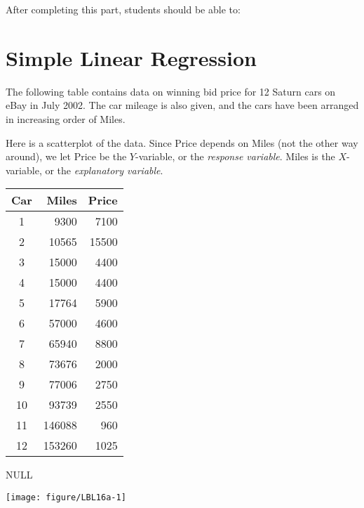 \documentclass[11pt]{book}\usepackage[]{graphicx}\usepackage[]{color}
\begin{document}
After completing this part, students should be able to:


\section{Simple Linear Regression}  

The following table contains data on winning bid price for 12 Saturn cars on eBay in July 2002.  The car mileage is also given, and the cars have been arranged in increasing order of Miles.

Here is a scatterplot of the data.  Since Price depends on Miles (not the other way around), we let Price be the $Y$-variable, or the \textit{response variable}.    Miles is the $X$-variable, or the \textit{explanatory variable}.

\newpage

\begin{minipage}[ht]{5cm}

\centering
{\small{
\begin{tabular}{@{} c rr @{}} \hline
Car & Miles & Price  \\ \hline
1 & 9300 & 7100 \\
2 & 10565 & 15500 \\
3 & 15000 & 4400 \\
4 & 15000 & 4400 \\
5 & 17764 & 5900 \\
6 & 57000 & 4600 \\
7 & 65940 & 8800 \\
8 & 73676 & 2000 \\
9 & 77006 & 2750 \\
10 & 93739 & 2550 \\
11 & 146088 & 960 \\
12 & 153260 & 1025 \\ \hline
\end{tabular}
}}

\end{minipage} \hfill
\begin{minipage}[ht]{9cm}

 \centering

NULL


{\centering \texttt{[image: figure/LBL16a-1]} 

}




\end{minipage}
\end{document}
